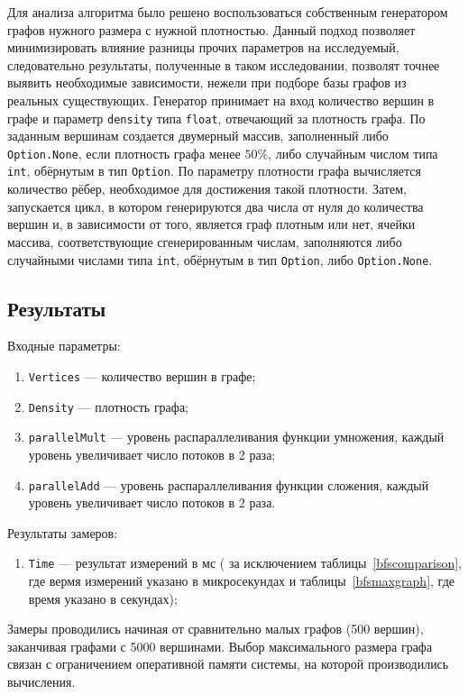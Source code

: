 Для анализа алгоритма было решено воспользоваться собственным генератором графов нужного размера с нужной плотностью. Данный подход позволяет минимизировать влияние разницы прочих параметров на исследуемый, следовательно результаты, полученные в таком исследовании, позволят точнее выявить необходимые зависимости, нежели при подборе базы графов из реальных существующих. Генератор принимает на вход количество вершин в графе и параметр \texttt{density} типа \texttt{float}, отвечающий за плотность графа. По заданным вершинам создается двумерный массив, заполненный либо \texttt{Option.None}, если плотность графа менее $50\%$, либо случайным числом типа \texttt{int}, обёрнутым в тип \texttt{Option}. По параметру плотности графа вычисляется количество рёбер, необходимое для достижения такой плотности.
Затем, запускается цикл, в котором генерируются два числа от нуля до количества вершин и, в зависимости от того, является граф плотным или нет, ячейки массива, соответствующие сгенерированным числам, заполняются либо случайными числами типа \texttt{int}, обёрнутым в тип \texttt{Option}, либо \texttt{Option.None}.  


\subsection{Результаты}

Входные параметры:
 \begin{enumerate}
 \item  \texttt{Vertices} --- количество вершин в графе; 
 \item  \texttt{Density} --- плотность графа;
 \item \texttt{parallelMult} --- уровень распараллеливания функции умножения, каждый уровень увеличивает число потоков в 2 раза;
  \item \texttt{parallelAdd} --- уровень распараллеливания функции сложения, каждый уровень увеличивает число потоков в 2 раза.
\end{enumerate}

Результаты замеров:
\begin{enumerate}
\item  \texttt{Time} --- результат измерений в мс ( за исключением таблицы~\ref{bfscomparison}, где вермя измерений указано в микросекундах и таблицы~\ref{bfsmaxgraph}, где время указано в секундах);
\end{enumerate}

Замеры проводились начиная от сравнительно малых графов (500 вершин), заканчивая графами с 5000 вершинами. Выбор максимального размера графа связан с ограничением оперативной памяти системы, на которой производились вычисления.

